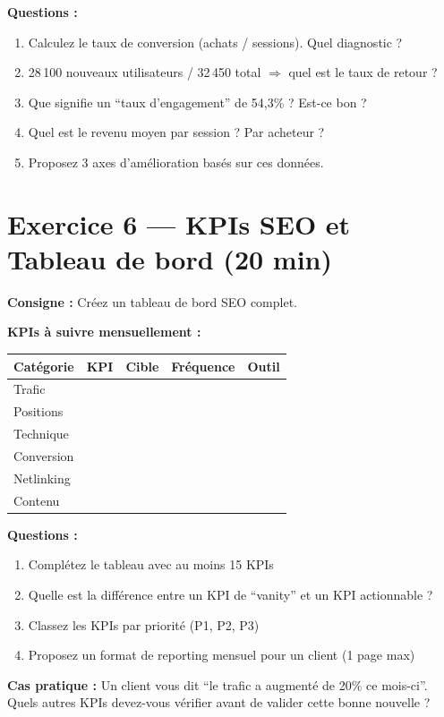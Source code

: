 \documentclass[12pt,a4paper]{report}
\begin{document}
\textbf{Questions :}
\begin{enumerate}
    \item Calculez le taux de conversion (achats / sessions). Quel diagnostic ?
    \item 28\,100 nouveaux utilisateurs / 32\,450 total $\Rightarrow$ quel est le taux de retour ?
    \item Que signifie un ``taux d'engagement'' de 54,3\% ? Est-ce bon ?
    \item Quel est le revenu moyen par session ? Par acheteur ?
    \item Proposez 3 axes d'am\'{e}lioration bas\'{e}s sur ces donn\'{e}es.
\end{enumerate}

\section{Exercice 6 --- KPIs SEO et Tableau de bord (20 min)}

\textbf{Consigne :} Cr\'{e}ez un tableau de bord SEO complet.

\textbf{KPIs \`{a} suivre mensuellement :}

\begin{longtable}{lllll}
\toprule
Cat\'{e}gorie & KPI & Cible & Fr\'{e}quence & Outil \\
\midrule
\endhead
\bottomrule
\endfoot
Trafic & & & & \\
Positions & & & & \\
Technique & & & & \\
Conversion & & & & \\
Netlinking & & & & \\
Contenu & & & & \\
\bottomrule
\end{longtable}

\textbf{Questions :}
\begin{enumerate}
    \item Compl\'{e}tez le tableau avec au moins 15 KPIs
    \item Quelle est la diff\'{e}rence entre un KPI de ``vanity'' et un KPI actionnable ?
    \item Classez les KPIs par priorit\'{e} (P1, P2, P3)
    \item Proposez un format de reporting mensuel pour un client (1 page max)
\end{enumerate}

\textbf{Cas pratique :} Un client vous dit ``le trafic a augment\'{e} de 20\% ce mois-ci''. Quels autres KPIs devez-vous v\'{e}rifier avant de valider cette bonne nouvelle ?
\end{document}
